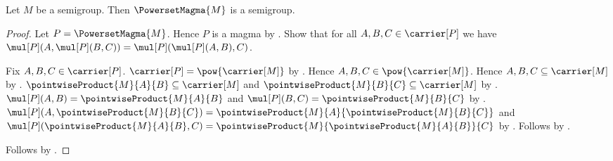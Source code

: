 \begin{theorem}\label{powerset_magma_is_semigroup}
    Let $M$ be a semigroup.
    Then $\PowersetMagma{M}$ is a semigroup.
\end{theorem}
\begin{proof}
    Let $P=\PowersetMagma{M}$.
    Hence $P$ is a magma by .
    Show that for all $A,B,C\in\carrier[P]$ we have
        $\mul[P](A,\mul[P](B,C))
            =\mul[P](\mul[P](A,B),C)$.
    \begin{subproof}
        Fix $A,B,C\in\carrier[P]$.
        $\carrier[P]=\pow{\carrier[M]}$ by
            .
        Hence $A,B,C\in\pow{\carrier[M]}$.
        Hence $A,B,C\subseteq\carrier[M]$ by .
        $\pointwiseProduct{M}{A}{B}\subseteq\carrier[M]$ and
            $\pointwiseProduct{M}{B}{C}\subseteq\carrier[M]$ by
            .
        $\mul[P](A,B)=\pointwiseProduct{M}{A}{B}$ and
            $\mul[P](B,C)=\pointwiseProduct{M}{B}{C}$ by
            .
        $\mul[P](A,\pointwiseProduct{M}{B}{C})
            =\pointwiseProduct{M}{A}{\pointwiseProduct{M}{B}{C}}$ and
        $\mul[P](\pointwiseProduct{M}{A}{B},C)
            =\pointwiseProduct{M}{\pointwiseProduct{M}{A}{B}}{C}$ by
            .
        Follows by .
    \end{subproof}
    Follows by
        .
\end{proof}
